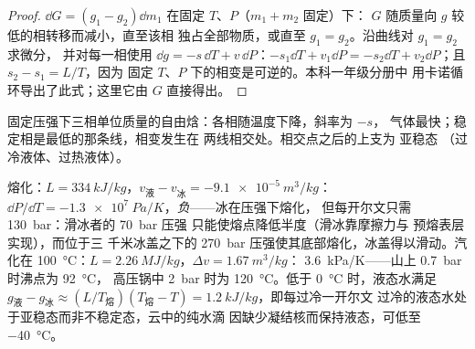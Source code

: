 \begin{proof}
$\dd G = (g_1 - g_2)\dd m_1$ 在固定 $T$、$P$（$m_1 + m_2$ 固定）下：
$G$ 随质量向 $g$ 较低的相转移而减小，直至该相
独占全部物质，或直至 $g_1 = g_2$。沿曲线对 $g_1 = g_2$ 求微分，
并对每一相使用 $\dd g = -s\,\dd T + v\,\dd P$：$-s_1\dd T +
v_1\dd P = -s_2\dd T + v_2\dd P$；且 $s_2 - s_1 = L/T$，因为
固定 $T$、$P$ 下的相变是可逆的。本科一年级分册中
用卡诺循环导出了此式；这里它由 $G$ 直接得出。
\end{proof}

\begin{omfigure}

{\small 固定压强下三相单位质量的自由焓：各相随温度下降，斜率为 $-s$，
气体最快；稳定相是最低的那条线，相变发生在
两线相交处。相交点之后的上支为
亚稳态
（过冷液体、过热液体）。}
\end{omfigure}

\begin{example}[水：斜率与亚稳态]\label{ex:b2:thermodynamic-potentials:water}
熔化：$L = \qty{334}{kJ/kg}$，$v_{\text{液}} - v_{\text{冰}} = -\qty{9.1e-5}{m^3/kg}$：
$\dd P/\dd T = \qty{-1.3e7}{Pa/K}$，\emph{负}——冰在压强下熔化，
但每开尔文只需 \qty{130}{bar}：滑冰者的 \qty{70}{bar} 压强
只能使熔点降低半度（滑冰靠摩擦力与
预熔表层实现），而位于三
千米冰盖之下的 \qty{270}{bar} 压强使其底部熔化，冰盖得以滑动。汽化在
\qty{100}{\celsius}：$L = \qty{2.26}{MJ/kg}$，$\Delta v = \qty{1.67}{m^3/kg}$：
\qty{3.6}{kPa/K}——山上 \qty{0.7}{bar} 时沸点为 \qty{92}{\celsius}，
高压锅中 \qty{2}{bar} 时为 \qty{120}{\celsius}。低于
\qty{0}{\celsius} 时，液态水满足 $g_{\text{液}} - g_{\text{冰}} \approx
(L/T_{\text{熔}})(T_{\text{熔}} - T) = \qty{1.2}{kJ/kg}$，即每过冷一开尔文
过冷的液态水处于亚稳态而非不稳定态，云中的纯水滴
因缺少凝结核而保持液态，可低至 \qty{-40}{\celsius}。
\end{example}

